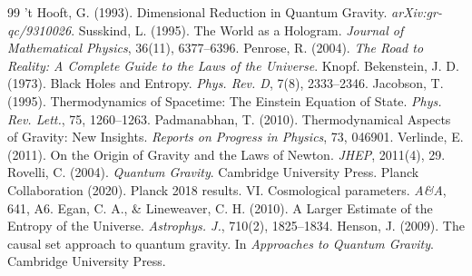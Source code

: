 \documentclass[12pt]{article}
\begin{document}

\begin{thebibliography}{99}
 't Hooft, G. (1993). Dimensional Reduction in Quantum Gravity. \textit{arXiv:gr-qc/9310026}.
 Susskind, L. (1995). The World as a Hologram. \textit{Journal of Mathematical Physics}, 36(11), 6377--6396.
 Penrose, R. (2004). \textit{The Road to Reality: A Complete Guide to the Laws of the Universe}. Knopf.
 Bekenstein, J. D. (1973). Black Holes and Entropy. \textit{Phys. Rev. D}, 7(8), 2333--2346.
 Jacobson, T. (1995). Thermodynamics of Spacetime: The Einstein Equation of State. \textit{Phys. Rev. Lett.}, 75, 1260--1263.
 Padmanabhan, T. (2010). Thermodynamical Aspects of Gravity: New Insights. \textit{Reports on Progress in Physics}, 73, 046901.
 Verlinde, E. (2011). On the Origin of Gravity and the Laws of Newton. \textit{JHEP}, 2011(4), 29.
 Rovelli, C. (2004). \textit{Quantum Gravity}. Cambridge University Press.
 Planck Collaboration (2020). Planck 2018 results. VI. Cosmological parameters. \textit{A\&A}, 641, A6.
 Egan, C. A., \& Lineweaver, C. H. (2010). A Larger Estimate of the Entropy of the Universe. \textit{Astrophys. J.}, 710(2), 1825--1834.
 Henson, J. (2009). The causal set approach to quantum gravity. In \textit{Approaches to Quantum Gravity}. Cambridge University Press.
\end{thebibliography}
\end{document}
